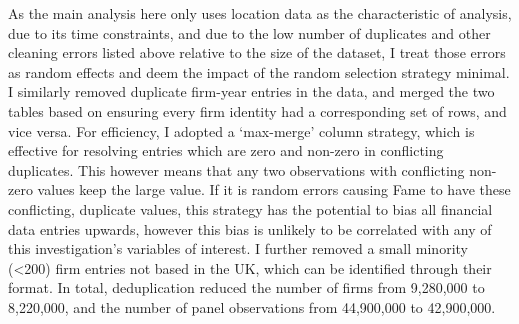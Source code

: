 As the main analysis here only uses location data as the  characteristic of analysis,
due to its time constraints, and due to the low number of duplicates
and other cleaning errors listed above relative to the size of the dataset,
I treat those errors as random effects and deem the impact of the random selection strategy minimal.
I similarly removed duplicate firm-year entries in the  data,
and merged the two tables based on ensuring every  firm identity
had a corresponding  set of rows, and vice versa.
For efficiency, I adopted a `max-merge' column strategy,
which is effective for resolving entries which are zero and non-zero in conflicting duplicates.
This however means that any two observations with conflicting non-zero values keep the large value.
If it is random errors causing Fame to have these conflicting, duplicate values,
this strategy has the potential to bias all financial data entries upwards,
however this bias is unlikely to be correlated with any of this investigation's variables of interest.
I further removed a small minority (<200) firm entries not based in the UK,
which can be identified through their  format.
In total, deduplication reduced the number of firms from 9,280,000 to 8,220,000,
and the number of panel observations from 44,900,000 to 42,900,000.


